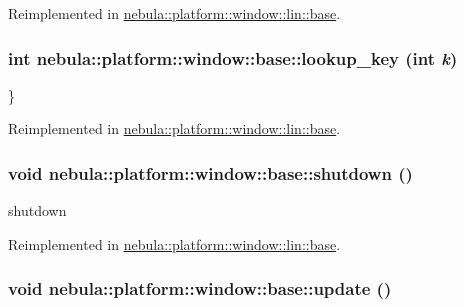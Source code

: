 Reimplemented in \hyperlink{classnebula_1_1platform_1_1window_1_1lin_1_1base_adc69f1c00bd65bf27f33f502cd026ffa}{nebula::platform::window::lin::base}.\hypertarget{classnebula_1_1platform_1_1window_1_1base_a9988c533e20319ce211ce20deab35cfa}{
\subsubsection[{lookup\_\-key}]{\setlength{\rightskip}{0pt plus 5cm}int nebula::platform::window::base::lookup\_\-key (int {\em k})}}
\label{classnebula_1_1platform_1_1window_1_1base_a9988c533e20319ce211ce20deab35cfa}


\} 

Reimplemented in \hyperlink{classnebula_1_1platform_1_1window_1_1lin_1_1base_af5ca9a6a75a661884dd934dc65ea59b2}{nebula::platform::window::lin::base}.\hypertarget{classnebula_1_1platform_1_1window_1_1base_a656d35bf58a3c27a07117b68de3ff2f1}{
\subsubsection[{shutdown}]{\setlength{\rightskip}{0pt plus 5cm}void nebula::platform::window::base::shutdown ()}}
\label{classnebula_1_1platform_1_1window_1_1base_a656d35bf58a3c27a07117b68de3ff2f1}


shutdown 

Reimplemented in \hyperlink{classnebula_1_1platform_1_1window_1_1lin_1_1base_a8541f8bd43b27bdf54c4951b5f2c76df}{nebula::platform::window::lin::base}.\hypertarget{classnebula_1_1platform_1_1window_1_1base_aac6186e43bad0446f303ced7e3593a3a}{
\subsubsection[{update}]{\setlength{\rightskip}{0pt plus 5cm}void nebula::platform::window::base::update ()}}
\label{classnebula_1_1platform_1_1window_1_1base_aac6186e43bad0446f303ced7e3593a3a}


